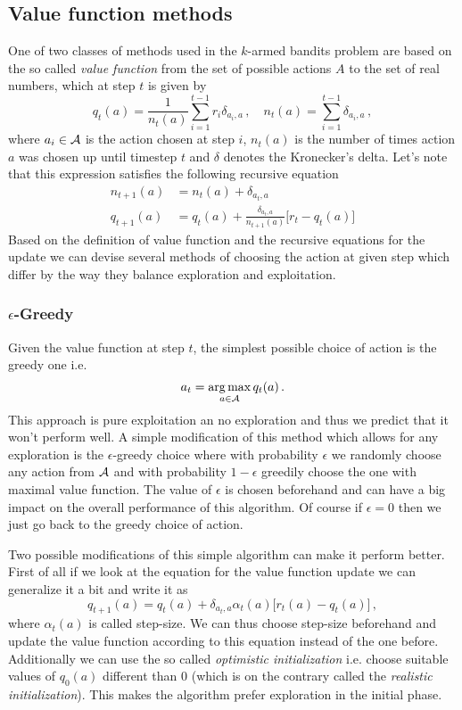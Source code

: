 \documentclass{myclass}
\begin{document}
\subsection{Value function methods}

One of two classes of methods used in the $k$-armed bandits problem are based on the so called
\emph{value function} from the set of possible actions $A$ to the set of real numbers, which at step
$t$ is given by
\[
    q_t(a) = \frac{1}{n_t(a)} \sum_{i=1}^{t-1} r_i \delta_{a_i,a}\,,\quad n_t(a) = \sum_{i=1}^{t-1} \delta_{a_i,a}\,,
\]
where $a_i \in \mathcal{A}$ is the action chosen at step $i$, $n_t(a)$ is the number of times action $a$
was chosen up until timestep $t$ and $\delta$ denotes the Kronecker's delta. Let's note that this
expression satisfies the following recursive equation
\[
\boxed
{
\begin{split}
    n_{t+1}(a) &= n_{t}(a) + \delta_{a_t,a}\\
    q_{t+1}(a) &= q_t(a) + \frac{\delta_{a_t, a}}{n_{t+1}(a)}\big[ r_t  - q_t(a) \big]
\end{split}
}
\]
Based on the definition of value function and the recursive equations for the update we can devise
several methods of choosing the action at given step which differ by the way they balance
exploration and exploitation.

\subsubsection{$\epsilon$-Greedy}

Given the value function at step $t$, the simplest possible choice of action is the greedy one i.e.
\[
    a_t = \operatorname*{arg\,max}_{a \in \mathcal{A}} q_t(a)\,.
\]
This approach is pure exploitation an no exploration and thus we predict that it won't perform well.
A simple modification of this method which allows for any exploration is the $\epsilon$-greedy
choice where with probability $\epsilon$ we randomly choose any action from $\mathcal{A}$ and with
probability $1-\epsilon$ greedily choose the one with maximal value function. The value of
$\epsilon$ is chosen beforehand and can have a big impact on the overall performance of this
algorithm. Of course if $\epsilon = 0$ then we just go back to the greedy choice of action.

Two possible modifications of this simple algorithm can make it perform better. First of all if we
look at the equation for the value function update we can generalize it a bit and write it as
\[
    q_{t+1}(a) = q_{t}(a) + \delta_{a_t,a} \alpha_t(a) \big[ r_t(a) - q_t(a) \big]\,,
\]
where $\alpha_t(a)$ is called step-size. We can thus choose step-size beforehand and update the
value function according to this equation instead of the one before. Additionally we can use the so
called \emph{optimistic initialization} i.e. choose suitable values of $q_0(a)$ different than 0
(which is on the contrary called the \emph{realistic initialization}). This makes the algorithm
prefer exploration in the initial phase.
\end{document}
